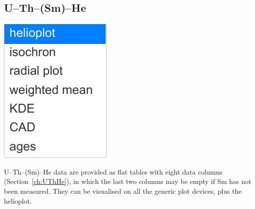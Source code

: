 \begin{refsection}

\chapter{U--Th--(Sm)--He}\label{ch:UThHe-R}

\noindent\begin{minipage}[t]{.15\linewidth}
\strut\vspace*{-\baselineskip}\newline
\includegraphics[width=\linewidth]{../figures/UThHePlotDevices.png}\\
\end{minipage}
\begin{minipage}[t]{.85\textwidth}
  U--Th--(Sm)--He data are provided as flat tables with eight data
  columns (Section~\ref{ch:UThHe}), in which the last two columns may
  be empty if Sm has not been measured. They can be visualised on all
  the generic plot devices, plus the helioplot.
\end{minipage}


\end{refsection}
